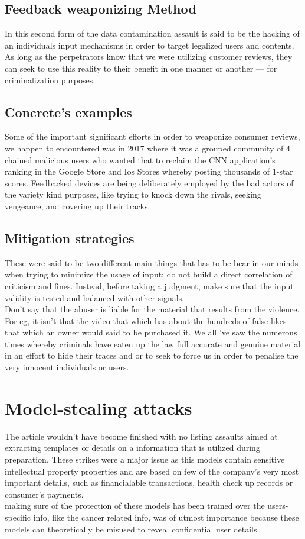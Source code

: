 \documentclass[journal,twoside,web]{ieeecolor}
\begin{document}
\subsection{Feedback weaponizing Method}
In this second form of the data contamination assault is said to be the hacking of an individuals input mechanisms in order to target legalized users and contents. As long as the perpetrators know that we were utilizing customer reviews, they can seek to use this reality to their benefit in one manner or another — for criminalization purposes.
\subsection{Concrete's examples}
Some of the important significant efforts in order to weaponize consumer reviews, we happen to encountered was in 2017 where it was a grouped community of 4 chained malicious users who wanted that to reclaim the CNN application's ranking in the Google Store and Ios Stores whereby posting thousands of 1-star scores.
Feedbacked devices are being deliberately employed by the bad actors of the variety kind purposes, like trying to knock down the rivals, seeking vengeance, and covering up their tracks.

\subsection{Mitigation strategies}
These were said to be two different main things that has to be bear in our minds when trying to minimize the usage of input: 
do not build a direct correlation of criticism and fines. Instead, before taking a judgment, make sure that the input validity is tested and balanced with other signals.\\
Don't say that the abuser is liable for the material that results from the violence. For eg, it isn't that the video that which has about the hundreds of false likes that which an owner would said to be purchased it. We all 've saw the numerous times whereby criminals have eaten up the law full accurate and genuine material in an effort to hide their traces and or to seek to force us in order to penalise the very innocent individuals or users.

\section{Model-stealing attacks}
The article wouldn't have become finished with no listing assaults aimed at extracting templates or details on a information that is utilized during preparation. These strikes were a major issue as this models contain sensitive intellectual property properties and are based on few of the company's very most important details, such as financialable transactions, health check up records or consumer's payments.\\
making sure of the protection of these models has been trained over the users-specific info, like the cancer related info, was of utmost importance because these models can theoretically be misused to reveal confidential user details.
\end{document}
